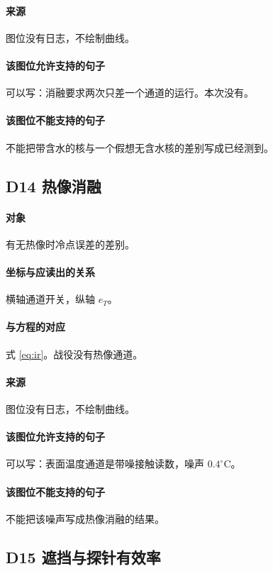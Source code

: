 \paragraph{来源}
图位没有日志，不绘制曲线。

\paragraph{该图位允许支持的句子}
可以写：消融要求两次只差一个通道的运行。本次没有。

\paragraph{该图位不能支持的句子}
不能把带含水的核与一个假想无含水核的差别写成已经测到。

\subsection{D14 热像消融}
\paragraph{对象}
有无热像时冷点误差的差别。

\paragraph{坐标与应读出的关系}
横轴通道开关，纵轴 $e_T$。

\paragraph{与方程的对应}
式 \eqref{eq:ir}。战役没有热像通道。

\paragraph{来源}
图位没有日志，不绘制曲线。

\paragraph{该图位允许支持的句子}
可以写：表面温度通道是带噪接触读数，噪声 $0.4^\circ\mathrm{C}$。

\paragraph{该图位不能支持的句子}
不能把该噪声写成热像消融的结果。

\subsection{D15 遮挡与探针有效率}
